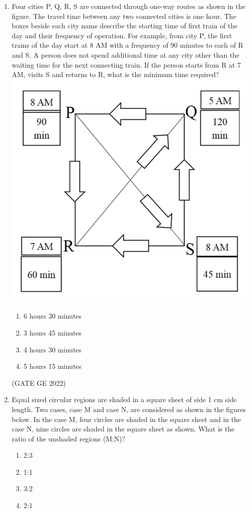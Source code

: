 \documentclass[journal,12pt,onecolumn]{IEEEtran}
\theoremstyle{remark}
\begin{document}
\begin{enumerate}
\item Four cities P, Q, R, S are connected through one-way routes as shown in the figure. The travel time between any two connected cities is one hour. The boxes beside each city name describe the starting time of first train of the day and their frequency of operation. For example, from city P, the first trains of the day start at 8 AM with a frequency of 90 minutes to each of R and S. A person does not spend additional time at any city other than the waiting time for the next connecting train.
If the person starts from R at 7 AM, visits S and returns to R, what is the minimum time required?
\centering \includegraphics[width=\columnwidth]{figs/fig_9.png}
\begin{enumerate}
    \item 6 hours 30 minutes
    \item 3 hours 45 minutes
    \item 4 hours 30 minutes
    \item 5 hours 15 minutes
\end{enumerate}

\hfill (GATE GE 2022)

\item Equal sized circular regions are shaded in a square sheet of side 1 cm side length. Two cases, case M and case N, are considered as shown in the figures below. In the case M, four circles are shaded in the square sheet and in the case N, nine circles are shaded in the square sheet as shown.
What is the ratio of the unshaded regions (M:N)?
\begin{enumerate}
    \item 2:3
    \item 1:1
    \item 3:2
    \item 2:1
\end{enumerate}


\end{enumerate}
\end{document}

